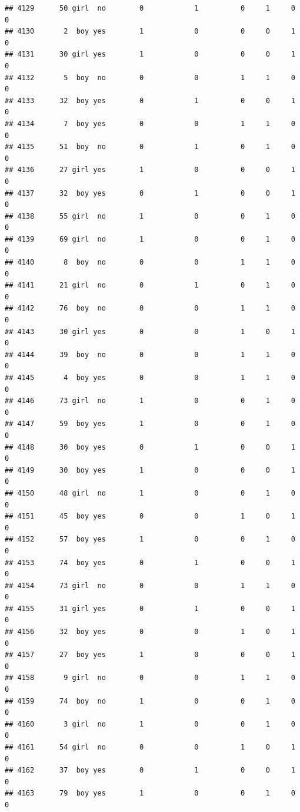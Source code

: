 \documentclass[man]{apa6}
\begin{document}
\begin{verbatim}
## 4129      50 girl  no        0            1          0     1     0     0
## 4130       2  boy yes        1            0          0     0     1     0
## 4131      30 girl yes        1            0          0     0     1     0
## 4132       5  boy  no        0            0          1     1     0     0
## 4133      32  boy yes        0            1          0     0     1     0
## 4134       7  boy yes        0            0          1     1     0     0
## 4135      51  boy  no        0            1          0     1     0     0
## 4136      27 girl yes        1            0          0     0     1     0
## 4137      32  boy yes        0            1          0     0     1     0
## 4138      55 girl  no        1            0          0     1     0     0
## 4139      69 girl  no        1            0          0     1     0     0
## 4140       8  boy  no        0            0          1     1     0     0
## 4141      21 girl  no        0            1          0     1     0     0
## 4142      76  boy  no        0            0          1     1     0     0
## 4143      30 girl yes        0            0          1     0     1     0
## 4144      39  boy  no        0            0          1     1     0     0
## 4145       4  boy yes        0            0          1     1     0     0
## 4146      73 girl  no        1            0          0     1     0     0
## 4147      59  boy yes        1            0          0     1     0     0
## 4148      30  boy yes        0            1          0     0     1     0
## 4149      30  boy yes        1            0          0     0     1     0
## 4150      48 girl  no        1            0          0     1     0     0
## 4151      45  boy yes        0            0          1     0     1     0
## 4152      57  boy yes        1            0          0     1     0     0
## 4153      74  boy yes        0            1          0     0     1     0
## 4154      73 girl  no        0            0          1     1     0     0
## 4155      31 girl yes        0            1          0     0     1     0
## 4156      32  boy yes        0            0          1     0     1     0
## 4157      27  boy yes        1            0          0     0     1     0
## 4158       9 girl  no        0            0          1     1     0     0
## 4159      74  boy  no        1            0          0     1     0     0
## 4160       3 girl  no        1            0          0     1     0     0
## 4161      54 girl  no        0            0          1     0     1     0
## 4162      37  boy yes        0            1          0     0     1     0
## 4163      79  boy yes        1            0          0     1     0     0

\end{verbatim}
\end{document}
